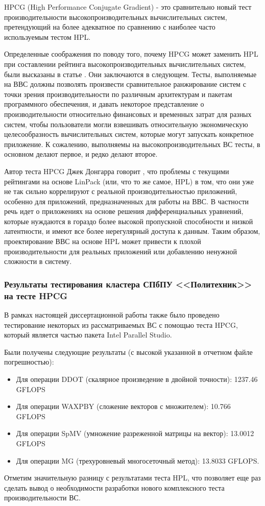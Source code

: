 HPCG (High Performance Conjugate Gradient) \cite{Dongarra2016HighperformanceCB} - это сравнительно новый тест производительности высокопроизводительных вычислительных систем, претендующий на более адекватное по сравнению с наиболее часто используемым тестом HPL.

Определенные соображения по поводу того, почему HPCG может заменить HPL при составлении рейтинга высокопроизводительных вычислительных систем, были высказаны в статье \cite{HPCGreplaceHPL}. Они заключаются в следующем. Тесты, выполняемые на ВВС должны позволять произвести сравнительное ранжирование систем с точки зрения производительности по различным архитектурам и пакетам программного обеспечения, и давать некоторое представление о производительности относительно финансовых и временных затрат для разных систем, чтобы пользователи могли взвешивать относительную экономическую целесообразность вычислительных систем, которые могут запускать конкретное приложение. К сожалению, выполняемы на высокопроизводительных ВС тесты, в основном делают первое, и редко делают второе. 

Автор теста HPCG Джек Донгарра говорит \cite{Dongarra2016HighperformanceCB}, что проблемы с текущими рейтингами на основе LinPack (или, что то же самое, HPL) в том, что они уже не так сильно коррелируют с реальной производительностью приложений, особенно для приложений, предназначенных для работы на ВВС. В частности речь идет о приложениях на основе решения дифференциальных уравнений, которые нуждаются в гораздо более высокой пропускной способности и низкой латентности, и имеют все более нерегулярный доступа к данным. Таким образом, проектирование ВВС на основе HPL может привести к плохой производительности для реальных приложений или добавлению ненужной сложности в систему.


 
\subsubsection{Результаты тестирования кластера СПбПУ <<Политехник>> на тесте HPCG}

В рамках настоящей диссертационной работы также было проведено тестирование некоторых из рассматриваемых ВС с помощью теста HPCG, который является частью пакета Intel Parallel Studio. 


Были получены следующие результаты (с высокой указанной в отчетном файле погрешностью):
\begin{itemize}
\item Для операции DDOT (скалярное произведение в двойной точности): 1237.46 GFLOPS
\item Для операции WAXPBY (сложение векторов с множителем): 10.766 GFLOPS
\item Для операции SpMV (умножение разреженной матрицы на вектор): 13.0012  GFLOPS
\item Для операции MG (трехуровневый многосеточный метод): 13.8033 GFLOPS.
\end{itemize}

Отметим значительную разницу с результатами теста HPL, что позволяет еще раз сделать вывод о необходимости разработки нового комплексного теста производительности ВС.
